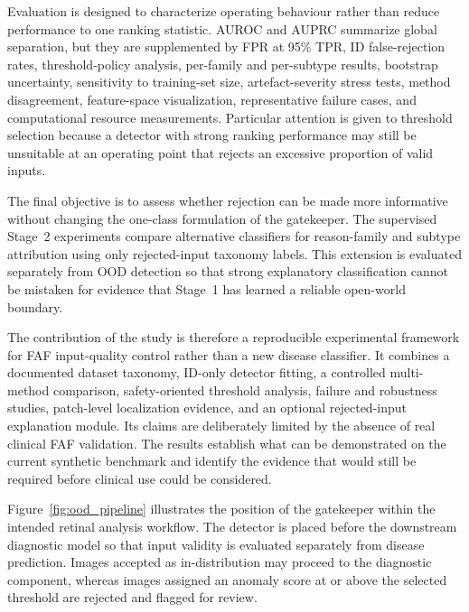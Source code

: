 \documentclass[fleqn,12pt]{olplainarticle}
\begin{document}
Evaluation is designed to characterize operating behaviour rather than reduce performance to one ranking statistic. AUROC and AUPRC summarize global separation, but they are supplemented by FPR at 95\% TPR, ID false-rejection rates, threshold-policy analysis, per-family and per-subtype results, bootstrap uncertainty, sensitivity to training-set size, artefact-severity stress tests, method disagreement, feature-space visualization, representative failure cases, and computational resource measurements. Particular attention is given to threshold selection because a detector with strong ranking performance may still be unsuitable at an operating point that rejects an excessive proportion of valid inputs.

The final objective is to assess whether rejection can be made more informative without changing the one-class formulation of the gatekeeper. The supervised Stage~2 experiments compare alternative classifiers for reason-family and subtype attribution using only rejected-input taxonomy labels. This extension is evaluated separately from OOD detection so that strong explanatory classification cannot be mistaken for evidence that Stage~1 has learned a reliable open-world boundary.

The contribution of the study is therefore a reproducible experimental framework for FAF input-quality control rather than a new disease classifier. It combines a documented dataset taxonomy, ID-only detector fitting, a controlled multi-method comparison, safety-oriented threshold analysis, failure and robustness studies, patch-level localization evidence, and an optional rejected-input explanation module. Its claims are deliberately limited by the absence of real clinical FAF validation. The results establish what can be demonstrated on the current synthetic benchmark and identify the evidence that would still be required before clinical use could be considered.

Figure~\ref{fig:ood_pipeline} illustrates the position of the gatekeeper within
the intended retinal analysis workflow. The detector is placed before the
downstream diagnostic model so that input validity is evaluated separately
from disease prediction. Images accepted as in-distribution may proceed to the
diagnostic component, whereas images assigned an anomaly score at or above the
selected threshold are rejected and flagged for review.
\end{document}
